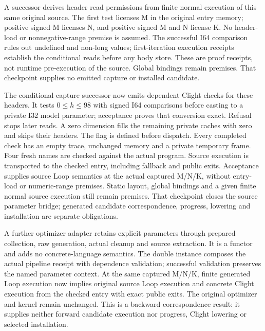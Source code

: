 A successor derives header read permissions from finite normal execution of
this same original source. The first test licenses M in the original entry
memory; positive signed M licenses N, and positive signed M and N license K.
No header-load or nonnegative-range premise is assumed. The successful I64
comparison rules out undefined and non-long values; first-iteration execution
receipts establish the conditional reads before any body store. These are
proof receipts, not runtime pre-execution of the source. Global bindings remain
premises. That checkpoint supplies no emitted capture or installed candidate.

The conditional-capture successor now emits dependent Clight checks for these
headers. It tests $0\leq h\leq98$ with signed I64 comparisons before casting
to a private I32 model parameter; acceptance proves that conversion exact.
Refusal stops later reads. A zero dimension fills the remaining private caches
with zero and skips their headers. The flag is defined before dispatch.
Every completed check has an empty trace, unchanged memory and a private
temporary frame. Four fresh names are checked against the actual program.
Source execution is transported to the checked entry, including fallback and
public exits. Acceptance supplies source Loop semantics at the actual captured
M/N/K, without entry-load or numeric-range premises. Static layout, global
bindings and a given finite normal source execution still remain premises.
That checkpoint closes the source parameter bridge; generated candidate
correspondence, progress, lowering and installation are separate obligations.

A further optimizer adapter retains explicit parameters through prepared
collection, raw generation, actual cleanup and source extraction. It is a
 functor and adds no concrete-language semantics. The double
instance composes the actual pipeline receipt with dependence validation;
successful validation preserves the named parameter context. At the same
captured M/N/K, finite generated Loop execution now implies original source
Loop execution and concrete Clight execution from the checked entry with exact
public exits. The original optimizer and kernel remain unchanged. This is a
backward correspondence result: it supplies neither forward candidate execution
nor progress, Clight lowering or selected installation.

